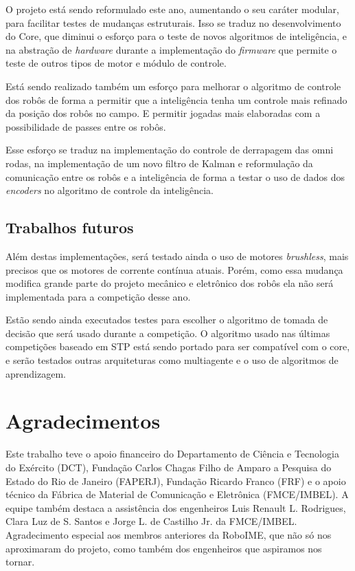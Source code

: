 \documentclass[conference]{IEEEtran}
\begin{document}
O projeto está sendo reformulado este ano, aumentando o seu caráter modular, para facilitar testes de mudanças estruturais. Isso se traduz no desenvolvimento do Core, que diminui o esforço para o teste de novos algoritmos de inteligência, e na abstração de \textit{hardware} durante a implementação do \textit{firmware} que permite o teste de outros tipos de motor e módulo de controle.

Está sendo realizado também um esforço para melhorar o algoritmo de controle dos robôs de forma a permitir que a inteligência tenha um controle mais refinado da posição dos robôs no campo. E permitir jogadas mais elaboradas com a possibilidade de passes entre os robôs. 

Esse esforço se traduz na implementação do controle de derrapagem das omni rodas, na implementação de um novo filtro de Kalman e reformulação da comunicação entre os robôs e a inteligência de forma a testar o uso de dados dos \textit{encoders} no algoritmo de controle da inteligência.

\subsection*{Trabalhos futuros}

Além destas implementações, será testado ainda o uso de motores \textit{brushless}, mais precisos que os motores de corrente contínua atuais. Porém, como essa mudança modifica grande parte do projeto mecânico e eletrônico dos robôs ela não será implementada para a competição desse ano.

Estão sendo ainda executados testes para escolher o algoritmo de tomada de decisão que será usado durante a competição. O algoritmo usado nas últimas competições baseado em STP está sendo portado para ser compatível com o core, e serão testados outras arquiteturas como multiagente e o uso de algoritmos de aprendizagem.

\section*{Agradecimentos}

Este trabalho teve o apoio financeiro do Departamento de Ciência e Tecnologia do Exército (DCT), Fundação Carlos Chagas Filho de Amparo a Pesquisa do Estado do Rio de Janeiro (FAPERJ), Fundação Ricardo Franco (FRF) e o apoio técnico da Fábrica de Material de Comunicação e Eletrônica (FMCE/IMBEL). A equipe também destaca a assistência dos engenheiros Luis Renault L. Rodrigues, Clara Luz de S. Santos e Jorge L. de Castilho Jr. da FMCE/IMBEL. Agradecimento especial aos membros anteriores da RoboIME, que não só nos aproximaram do projeto, como também dos engenheiros que aspiramos nos tornar. 
\end{document}
